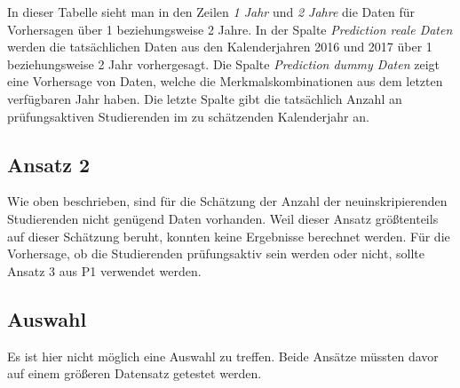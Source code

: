 In dieser Tabelle sieht man in den Zeilen \textit{1 Jahr} und \textit{2 Jahre} die Daten f\"ur Vorhersagen \"uber 1 beziehungsweise 2 Jahre. 
In der Spalte \textit{Prediction reale Daten} werden die tats\"achlichen Daten aus den Kalenderjahren 2016 und 2017 \"uber 1 beziehungsweise 
2 Jahr vorhergesagt. Die Spalte \textit{Prediction dummy Daten} zeigt eine Vorhersage von Daten, welche die Merkmalskombinationen aus dem letzten 
verf\"ugbaren Jahr haben. Die letzte Spalte gibt die tats\"achlich Anzahl an pr\"ufungsaktiven Studierenden im zu sch\"atzenden Kalenderjahr an. \\


\subsection{Ansatz 2}
Wie oben beschrieben, sind f\"ur die Sch\"atzung der Anzahl der neuinskripierenden Studierenden nicht gen\"ugend Daten vorhanden. 
Weil dieser Ansatz gr\"o{\ss}tenteils auf dieser Sch\"atzung beruht, konnten keine Ergebnisse berechnet werden. F\"ur die Vorhersage, 
ob die Studierenden pr\"ufungsaktiv sein werden oder nicht, sollte Ansatz 3 aus P1 verwendet werden. 

\subsection{Auswahl}
Es ist hier nicht m\"oglich eine Auswahl zu treffen. Beide Ans\"atze m\"ussten davor auf einem gr\"o{\ss}eren Datensatz getestet werden.

